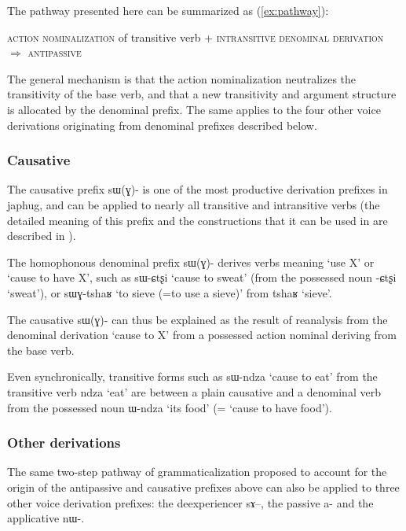 \documentclass[oldfontcommands,oneside,a4paper,11pt]{article}
\newcommand{\ipa}[1]{{\phon #1}} %
\begin{document}
The pathway presented here can be summarized as (\ref{ex:pathway}):

\begin{exe}
\ex \label{ex:pathway}
\glt \textsc{action nominalization} of transitive verb + \textsc{intransitive denominal derivation} $\Rightarrow$ \textsc{antipassive}
\end{exe}

The general mechanism is that the action nominalization neutralizes the transitivity of the base verb, and that a new transitivity and argument structure is allocated by the denominal prefix. The same applies to the four other voice derivations originating from denominal prefixes described below.

\subsubsection{Causative}
The causative prefix \ipa{sɯ(ɣ)-} is one of the most productive derivation prefixes in japhug, and can be applied to nearly all transitive and intransitive verbs (the detailed meaning of this prefix and the constructions that it can be used in are described in \citealt{jacques15causative}). 

 The homophonous denominal prefix \ipa{sɯ(ɣ)-} derives verbs meaning `use X' or `cause to have X', such as \ipa{sɯ-ɕtʂi} `cause to sweat' (from the possessed noun \ipa{-ɕtʂi} `sweat'), or \ipa{sɯɣ-tshaʁ} `to sieve (=to use a sieve)' from \ipa{tshaʁ} `sieve'. 

The causative \ipa{sɯ(ɣ)-} can thus be explained as the result of reanalysis from the denominal derivation `cause to X' from a possessed action nominal deriving from the base verb. 

Even synchronically, transitive forms such as \ipa{sɯ-ndza} `cause to eat' from the transitive verb \ipa{ndza} `eat' are between a plain causative and a denominal verb from the possessed noun \ipa{ɯ-ndza} `its food' (= `cause to have food'). 



\subsubsection{Other derivations}
The same two-step pathway of grammaticalization proposed to account for the origin of the antipassive and causative prefixes above can also be applied to three other voice derivation prefixes: the deexperiencer \ipa{sɤ--}, the passive \ipa{a-} and the applicative \ipa{nɯ-}.
\end{document}
